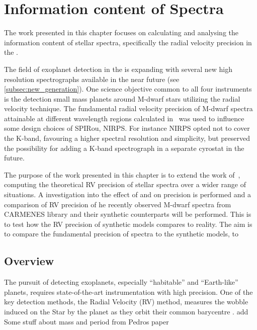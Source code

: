 
\chapter{Information content of \nir{} Spectra}
\label{cha:nir_content}

The work presented in this chapter focuses on calculating and analysing the information content of stellar spectra, specifically the radial velocity precision in the \nir{}. 

The field of exoplanet detection in the \nir{} is expanding with several new high resolution \nir{} spectrographs available in the near future (see \cref{subsec:new_generation}).
One science objective common to all four instruments is the detection small mass planets around {M-dwarf} stars utilizing the radial velocity technique.
The fundamental radial velocity precision of {M-dwarf} spectra attainable at different wavelength regions calculated in~\citet{figueira_radial_2016} was used to influence some design choices of {SPIRou}, {NIRPS}. For instance NIRPS opted not to cover the K-band, favouring a higher spectral resolution and simplicity, but preserved the possibility for adding a K-band spectrograph in a separate cyrostat in the future.

The purpose of the work presented in this chapter is to extend the work of~\citet{figueira_radial_2016}, computing the theoretical RV precision of stellar spectra over a wider range of situations.
A investigation into the effect of \logg{} and \feh{} on precision is performed and a comparison of RV precision of he recently observed \nir{} {M-dwarf} spectra from {CARMENES} library and their synthetic counterparts will be performed.
This is to test how the {RV} precision of synthetic models compares to reality.
The aim is to compare the fundamental precision of \nir{} spectra to the synthetic models, to


\section{Overview}

The pursuit of detecting exoplanets, especially ``habitable'' and ``Earth-like'' planets, requires state-of-the-art instrumentation with high precision.
One of the key detection methods, the Radial Velocity ({RV}) method, measures the wobble induced on the Star by the planet as they orbit their common barycentre .  {\red{} add Some stuff about mass and period from Pedros paper}  



